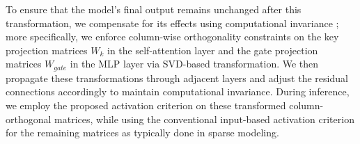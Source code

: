 To ensure that the model's final output remains unchanged after this transformation, we compensate for its effects using computational invariance \citep{ashkboos2024slicegptcompresslargelanguage}; more specifically, we enforce column-wise orthogonality constraints on the key projection matrices $W_k$ in the self-attention layer and the gate projection matrices $W_{gate}$ in the MLP layer via SVD-based transformation. We then propagate these transformations through adjacent layers and adjust the residual connections accordingly to maintain computational invariance. During inference, we employ the proposed activation criterion on these transformed column-orthogonal matrices, while using the conventional input-based activation criterion for the remaining matrices as typically done in sparse modeling. 









